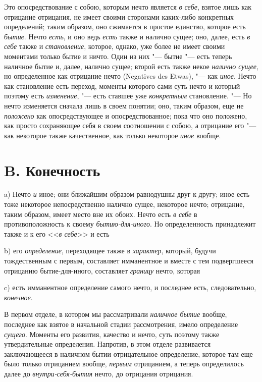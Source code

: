 Это опосредствование с собою, которым нечто является
{\em в себе}, взятое лишь как отрицание отрицания, не
имеет своими сторонами каких-либо конкретных определений; таким образом,
оно сжимается в простое единство, которое есть
{\em бытие}. Нечто {\em есть}, и
оно ведь {\em есть} также и налично сущее; оно, далее,
есть {\em в себе} также и
{\em становление}, которое, однако, уже более не имеет
своими моментами только бытие и ничто. Один из них "--- бытие "--- есть теперь
наличное бытие и, далее, налично сущее; второй есть также некое
{\em налично сущее}, но определенное как отрицание
нечто (Negatives des Etwas), "--- как {\em иное}.
Нечто как становление есть переход, моменты которого сами суть нечто и
который поэтому есть {\em изменение}, "--- есть ставшее
уже {\em конкретным} становление. "--- Но нечто изменяется
сначала лишь в своем понятии; оно, таким образом, еще не
{\em положено} как опосредствующее и опосредствованное;
пока что оно положено, как просто сохраняющее себя в своем соотношении с
собою, а отрицание его "--- как некоторое также качественное, как только
некоторое {\em иное} вообще.

\section[B. Конечность]{B. Конечность}
a) Нечто {\em и} иное; они ближайшим образом
равнодушны друг к другу; иное есть тоже некоторое непосредственно налично
сущее, некоторое нечто; отрицание, таким образом, имеет место вне их обоих.
Нечто есть {\em в себе} в противоположность к своему
{\em бытию-для-иного}. Но определенность принадлежит
также и к его <<{\em в себе}>> и есть

b) его {\em определение}, переходящее также в
{\em характер}, который, будучи
тождественным с первым, составляет имманентное и вместе с тем подвергшееся
отрицанию бытие-для-иного, составляет {\em границу}
нечто, которая

c) есть имманентное определение самого нечто, и последнее есть,
следовательно, {\em конечное}.

В первом отделе, в котором мы рассматривали
{\em наличное бытие} вообще, последнее как взятое в
начальной стадии рассмотрения, имело определение
{\em сущего}. Моменты его развития, качество и нечто,
суть поэтому также утвердительные определения. Напротив, в этом отделе
развивается заключающееся в наличном бытии отрицательное определение,
которое там еще было только отрицанием вообще,
{\em первым} отрицанием, а теперь определилось далее до
{\em внутри-себя-бытия} нечто, до отрицания отрицания.

